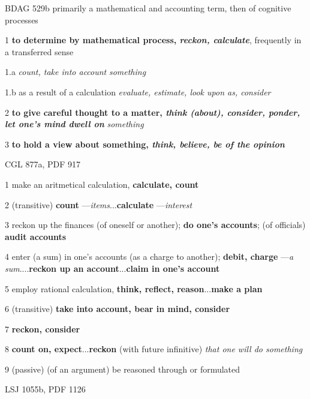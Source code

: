 				\begin{compactdesc}
					\item[BDAG 529b] primarily a mathematical and accounting term, then of cognitive processes
						\begin{compactitem}
							\item[1] \textbf{to determine by mathematical process, \textit{reckon, calculate}}, frequently in a transferred sense
							\item[1.a] \textit{count, take into account}  \textit{something}
							\item[1.b] as a result of a calculation \textit{evaluate, estimate, look upon as, consider}
							\item[2] \textbf{to give careful thought to a matter, \textit{think (about), consider, ponder, let one's mind dwell on}}  \textit{something}
							\item[3] \textbf{to hold a view about something, \textit{think, believe, be of the opinion}}
						\end{compactitem}
					\item[CGL 877a, PDF 917] \textbf{}
						\begin{compactitem}
							\item[1] make an aritmetical calculation, \textbf{calculate, count}
							\item[2] (transitive) \textbf{count} ---\textit{items}...\textbf{calculate} ---\textit{interest}
							\item[3] reckon up the finances (of oneself or another); \textbf{do one's accounts}; (of officials) \textbf{audit accounts}
							\item[4] enter (a sum) in one's accounts (as a charge to another); \textbf{debit, charge} ---\textit{a sum}....\textbf{reckon up an account}...\textbf{claim in one's account}
							\item[5] employ rational calculation, \textbf{think, reflect, reason}...\textbf{make a plan}
							\item[6] (transitive) \textbf{take into account, bear in mind, consider}
							\item[7] \textbf{reckon, consider}
							\item[8] \textbf{count on, expect}...\textbf{reckon} (with future infinitive) \textit{that one will do something}
							\item[9] (passive) (of an argument) be reasoned through or formulated
						\end{compactitem}
					\item[LSJ 1055b, PDF 1126] \textbf{}

\end{compactdesc}
